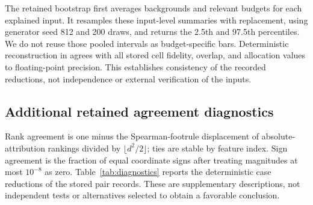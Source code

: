\documentclass{article}
\begin{document}
The retained bootstrap first averages backgrounds and relevant budgets for each explained input. It resamples these input-level summaries with replacement, using generator seed 812 and 200 draws, and returns the 2.5th and 97.5th percentiles. We do not reuse those pooled intervals as budget-specific bars. Deterministic reconstruction in  agrees with all stored cell fidelity, overlap, and allocation values to floating-point precision. This establishes consistency of the recorded reductions, not independence or external verification of the inputs.

\subsection{Additional retained agreement diagnostics}
Rank agreement is one minus the Spearman-footrule displacement of absolute-attribution rankings divided by $\lfloor d^2/2\rfloor$; ties are stable by feature index. Sign agreement is the fraction of equal coordinate signs after treating magnitudes at most $10^{-8}$ as zero. Table~\ref{tab:diagnostics} reports the deterministic case reductions of the stored pair records. These are supplementary descriptions, not independent tests or alternatives selected to obtain a favorable conclusion.
\end{document}
